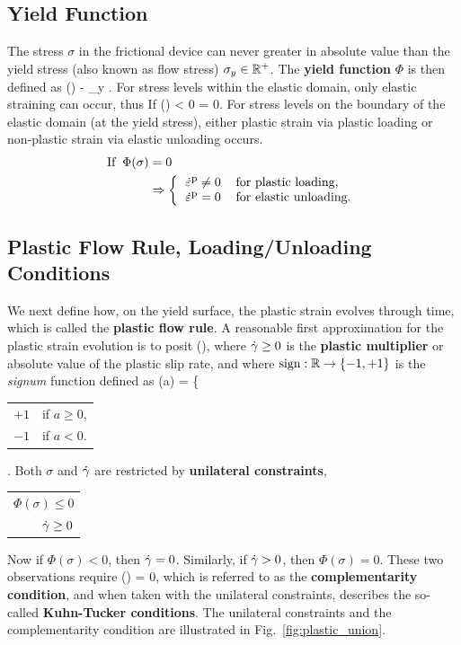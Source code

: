 \subsection{Yield Function}
The stress $\sigma$ in the frictional device can never greater in 
absolute value than the yield stress (also known
as flow stress) $\sigma_y \in {\mathbb{R}^+}$.
The {\bf yield function} $\Phi$ is then defined as 
\be
 \Phi(\sigma)  \abs{\sigma} - \sigma_y .
 \label{eq:yieldFunctionPerfectPlastic}
\ee
For stress levels within the elastic domain, 
only elastic straining can occur, thus
\be
 \mbox{If} \;\;\; \Phi(\sigma) < 0 \Rightarrow \hstrainpdot = 0.
\ee
For stress levels on the boundary of the elastic domain 
(at the yield stress), either plastic strain via plastic loading or
non-plastic strain via elastic unloading occurs.
\begin{align}
 \mbox{If} \;\; \Phi(\sigma) & = 0  \nonumber \\
  & \Rightarrow  
   \left\{
     \begin{tabular}{ll}
     $\hstrainpdot \neq 0$ & for plastic loading, \\
     $\hstrainpdot = 0$ & for elastic unloading.
     \end{tabular}
   \right.
\end{align}

\subsection{Plastic Flow Rule, Loading/Unloading Conditions}
We next define how, on the yield surface, the plastic strain evolves 
through time, which is called the 
{\bf plastic flow rule}.  A reasonable first approximation for the 
plastic strain evolution is to posit
\be
 \hstrainpdot {} \gammadot \; \sign (\sigma),
 \label{eq:flowrule}
\ee
where $\dot{\gamma} \geq 0$ is the {\bf plastic multiplier} or 
absolute value of the plastic slip rate, and 
where $\mbox{sign} : \mathbb{R} \rightarrow \{-1,+1\}$ is the {\em signum} 
function defined as
\be
 \sign(a) = 
 \left\{ 
   \begin{tabular}{rl}
    $+1$ & if $a \geq 0$, \\
    $-1$ & if $a < 0$.
   \end{tabular}
 \right.
\ee
Both $\sigma$ and $\dot{\gamma}$ are restricted by {\bf unilateral constraints}, 
\be
 \begin{tabular}{r}
  $\Phi(\sigma) \leq 0$ \\
   $\gammadot \geq 0$ 
 \end{tabular}
\ee
Now if $\Phi(\sigma) < 0$, then $\dot{\gamma} = 0$.  
Similarly, if $\dot{\gamma} > 0$, then $\Phi(\sigma) = 0$.
These two observations require
\be
\gammadot \; \Phi(\sigma) = 0,
\ee
which is referred to as the {\bf complementarity condition}, 
and when taken with the unilateral constraints, describes the
so-called {\bf Kuhn-Tucker conditions}.
The unilateral constraints and the complementarity condition are illustrated 
in Fig.~\ref{fig:plastic_union}.

